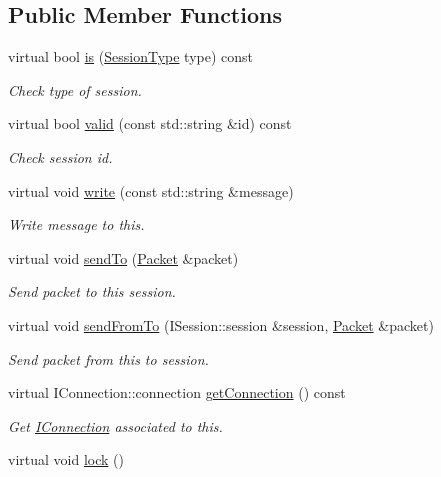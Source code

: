 \subsection*{Public Member Functions}
\begin{DoxyCompactItemize}
\item 
virtual bool \hyperlink{class_no_session_ae3d194013e7fbe54a1706c83ac6eff85}{is} (\hyperlink{class_i_session_a7989a93d03d8345d213a021d7444a32f}{Session\-Type} type) const 
\begin{DoxyCompactList}\small\item\em Check type of session. \end{DoxyCompactList}\item 
virtual bool \hyperlink{class_no_session_a722db0a22a10cdb1ed20ae2c9b5cbf27}{valid} (const std\-::string \&id) const 
\begin{DoxyCompactList}\small\item\em Check session id. \end{DoxyCompactList}\item 
virtual void \hyperlink{class_no_session_ab24439680fcf4bec40e05126ea7b717c}{write} (const std\-::string \&message)
\begin{DoxyCompactList}\small\item\em Write message to this. \end{DoxyCompactList}\item 
virtual void \hyperlink{class_no_session_ae281aac87c5d2f1b1c0e48d142080f9a}{send\-To} (\hyperlink{class_packet}{Packet} \&packet)
\begin{DoxyCompactList}\small\item\em Send packet to this session. \end{DoxyCompactList}\item 
virtual void \hyperlink{class_no_session_ac94b682544d3b6180e7488705dd22d87}{send\-From\-To} (I\-Session\-::session \&session, \hyperlink{class_packet}{Packet} \&packet)
\begin{DoxyCompactList}\small\item\em Send packet from this to session. \end{DoxyCompactList}\item 
virtual I\-Connection\-::connection \hyperlink{class_no_session_a1370fdfdaba32877d91de56b12d6d8b2}{get\-Connection} () const 
\begin{DoxyCompactList}\small\item\em Get \hyperlink{class_i_connection}{I\-Connection} associated to this. \end{DoxyCompactList}\item 
\hypertarget{class_no_session_a2f7955b7466a3b3a607eff0114b14ae5}{virtual void \hyperlink{class_no_session_a2f7955b7466a3b3a607eff0114b14ae5}{lock} ()}\label{class_no_session_a2f7955b7466a3b3a607eff0114b14ae5}


\end{DoxyCompactItemize}
